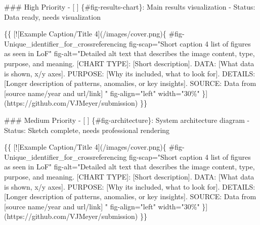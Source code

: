 \documentclass[
  11pt,
  letterpaper,
]{book}
\newenvironment{Shaded}{\begin{snugshade}}{\end{snugshade}}
\newcommand{\CommentTok}[1]{\textcolor[rgb]{0.37,0.37,0.37}{#1}}
\newcommand{\FunctionTok}[1]{\textcolor[rgb]{0.28,0.35,0.67}{#1}}
\newcommand{\NormalTok}[1]{\textcolor[rgb]{0.00,0.23,0.31}{#1}}
\newcommand{\OtherTok}[1]{\textcolor[rgb]{0.00,0.23,0.31}{#1}}
\newcommand{\SpecialStringTok}[1]{\textcolor[rgb]{0.13,0.47,0.30}{#1}}
\newcommand{\VariableTok}[1]{\textcolor[rgb]{0.07,0.07,0.07}{#1}}
\begin{document}
\begin{Shaded}
\begin{Highlighting}[]
\FunctionTok{\#\#\# High Priority}
\SpecialStringTok{{-} }\VariableTok{[ ]}\NormalTok{ \{\#fig{-}results{-}chart\}: Main results visualization}
\SpecialStringTok{  {-} }\NormalTok{Status: Data ready, needs visualization}

\NormalTok{\{\{}
\CommentTok{[}\OtherTok{![Example Caption/Title 4}\CommentTok{](/images/cover.png)}\NormalTok{\{}
\NormalTok{    \#fig{-}Unique\_identifier\_for\_crossreferencing}
\NormalTok{    fig{-}scap="Short caption 4 list of figures as seen in LoF"}
\NormalTok{    fig{-}alt="Detailed alt text that describes the image content, type, purpose, and meaning.}
            \OtherTok{[CHART TYPE]: }\CommentTok{[}\OtherTok{Short description}\CommentTok{]}\NormalTok{.}
\NormalTok{                DATA: }\CommentTok{[}\OtherTok{What data is shown, x/y axes}\CommentTok{]}\NormalTok{.}
\NormalTok{                PURPOSE: }\CommentTok{[}\OtherTok{Why it\textquotesingle{}s included, what to look for}\CommentTok{]}\NormalTok{.}
\NormalTok{                DETAILS: }\CommentTok{[}\OtherTok{Longer description of patterns, anomalies, or key insights}\CommentTok{]}\NormalTok{.}
\NormalTok{                SOURCE: Data from }\CommentTok{[}\OtherTok{source name/year and url/link}\CommentTok{]}
\NormalTok{            "}
\NormalTok{    fig{-}align="left"}
\NormalTok{    width="30\%"}
\NormalTok{    \}](https://github.com/VJMeyer/submission)}
\NormalTok{\}\}}

\FunctionTok{\#\#\# Medium Priority}
\SpecialStringTok{{-} }\VariableTok{[ ]}\NormalTok{ \{\#fig{-}architecture\}: System architecture diagram}
\SpecialStringTok{  {-} }\NormalTok{Status: Sketch complete, needs professional rendering}

\NormalTok{\{\{}
\CommentTok{[}\OtherTok{![Example Caption/Title 4}\CommentTok{](/images/cover.png)}\NormalTok{\{}
\NormalTok{    \#fig{-}Unique\_identifier\_for\_crossreferencing}
\NormalTok{    fig{-}scap="Short caption 4 list of figures as seen in LoF"}
\NormalTok{    fig{-}alt="Detailed alt text that describes the image content, type, purpose, and meaning.}
            \OtherTok{[CHART TYPE]: }\CommentTok{[}\OtherTok{Short description}\CommentTok{]}\NormalTok{.}
\NormalTok{                DATA: }\CommentTok{[}\OtherTok{What data is shown, x/y axes}\CommentTok{]}\NormalTok{.}
\NormalTok{                PURPOSE: }\CommentTok{[}\OtherTok{Why it\textquotesingle{}s included, what to look for}\CommentTok{]}\NormalTok{.}
\NormalTok{                DETAILS: }\CommentTok{[}\OtherTok{Longer description of patterns, anomalies, or key insights}\CommentTok{]}\NormalTok{.}
\NormalTok{                SOURCE: Data from }\CommentTok{[}\OtherTok{source name/year and url/link}\CommentTok{]}
\NormalTok{            "}
\NormalTok{    fig{-}align="left"}
\NormalTok{    width="30\%"}
\NormalTok{    \}](https://github.com/VJMeyer/submission)}
\NormalTok{\}\}}


\end{Highlighting}
\end{Shaded}
\end{document}
